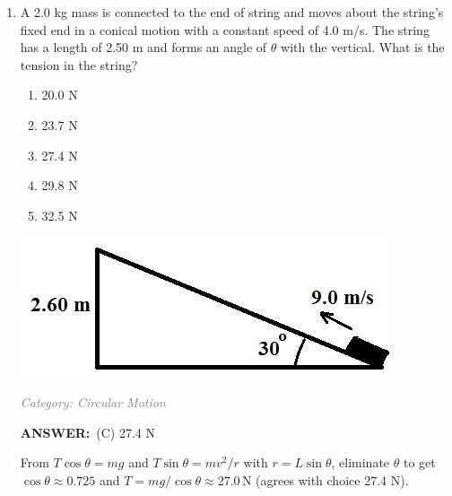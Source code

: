 \documentclass[12pt, a4paper]{article}
\makeatletter
\newcommand{\finalanswer}[1]{\textbf{ANSWER:}~#1}
\newif\if@categoryprinted
\newcommand{\category}[1]{\if@categoryprinted\relax\else\textit{\textcolor{gray}{Category: #1}}\global\@categoryprintedtrue\fi}
\makeatother
\begin{document}
\begin{CJK*}{UTF8}{gbsn}
\begin{enumerate}[itemsep=1.0em, topsep=0.6em]
\item \label{prob:27}
\noindent\begin{minipage}[t]{0.6\linewidth}
\vspace{0pt}
A 2.0 kg mass is connected to the end of string and moves about the string’s fixed end in a conical motion with a constant speed of 4.0 m/s. The string has a length of 2.50 m and forms an angle of $\theta$ with the vertical. What is the tension in the string?
\begin{enumerate}[label=(\Alph*)]
    \item 20.0 N
    \item 23.7 N
    \item 27.4 N
    \item 29.8 N
    \item 32.5 N
\end{enumerate}
\end{minipage}%
\hfill
\begin{minipage}[t]{0.35\linewidth}
\vspace{0pt}
\centering
\includegraphics[width=\linewidth]{Problem_28_Figure.png}
\end{minipage}

\category{Circular Motion}
\begin{answerbox}
\finalanswer{(C) 27.4 N}
\end{answerbox}
\begin{solutionbox}

From $T\cos\theta=mg$ and $T\sin\theta=mv^2/r$ with $r=L\sin\theta$, eliminate $\theta$ to get $\cos\theta\approx0.725$ and $T=mg/\cos\theta\approx27.0\,\text{N}$ (agrees with choice 27.4 N).
\end{solutionbox}


\end{enumerate}
\end{CJK*}
\end{document}
